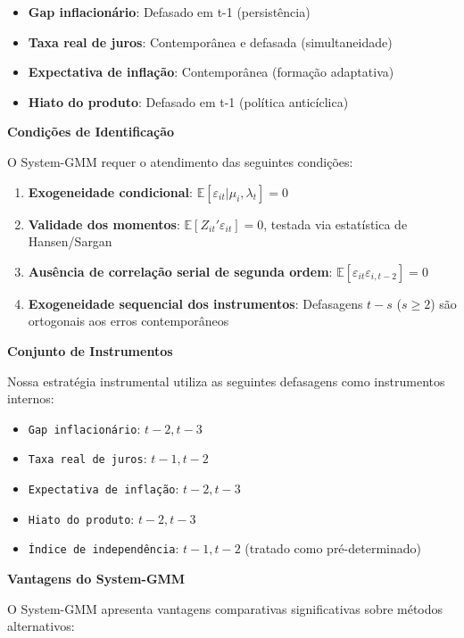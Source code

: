 \documentclass[a4paper,12pt]{article}
\begin{document}
\begin{itemize}
    \item \textbf{Gap inflacionário}: Defasado em t-1 (persistência)
    \item \textbf{Taxa real de juros}: Contemporânea e defasada (simultaneidade)  
    \item \textbf{Expectativa de inflação}: Contemporânea (formação adaptativa)
    \item \textbf{Hiato do produto}: Defasado em t-1 (política anticíclica)
\end{itemize}

\textbf{Condições de Identificação}

O System-GMM requer o atendimento das seguintes condições:

\begin{enumerate}
    \item \textbf{Exogeneidade condicional}: $\mathbb{E}[\varepsilon_{it}|\mu_i,\lambda_t] = 0$
    \item \textbf{Validade dos momentos}: $\mathbb{E}[Z_{it}'\varepsilon_{it}] = 0$, testada via estatística de Hansen/Sargan
    \item \textbf{Ausência de correlação serial de segunda ordem}: $\mathbb{E}[\varepsilon_{it}\varepsilon_{i,t-2}] = 0$
    \item \textbf{Exogeneidade sequencial dos instrumentos}: Defasagens $t-s$ ($s \geq 2$) são ortogonais aos erros contemporâneos
\end{enumerate}

\textbf{Conjunto de Instrumentos}

Nossa estratégia instrumental utiliza as seguintes defasagens como instrumentos internos:

\begin{itemize}
    \item \texttt{Gap inflacionário}: $t-2, t-3$
    \item \texttt{Taxa real de juros}: $t-1, t-2$  
    \item \texttt{Expectativa de inflação}: $t-2, t-3$
    \item \texttt{Hiato do produto}: $t-2, t-3$
    \item \texttt{Índice de independência}: $t-1, t-2$ (tratado como pré-determinado)
\end{itemize}

\textbf{Vantagens do System-GMM}

O System-GMM apresenta vantagens comparativas significativas sobre métodos alternativos:
\end{document}

